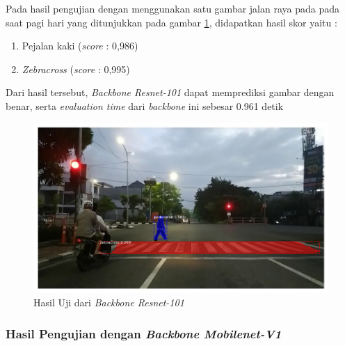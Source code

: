 Pada hasil pengujian dengan menggunakan satu gambar jalan raya pada pada saat pagi hari yang ditunjukkan pada gambar \ref{fig:hasil-resnet101}, didapatkan hasil skor yaitu :
\begin{enumerate}[nolistsep]
	\item Pejalan kaki (\textit{score} : 0,986)
	\item \textit{Zebracross} (\textit{score} : 0,995)
\end{enumerate}
Dari hasil tersebut, \textit{Backbone Resnet-101} dapat memprediksi gambar dengan benar, serta \textit{evaluation time} dari \textit{backbone} ini sebesar 0.961 detik
\begin{figure}[H] 
	\centering
	\includegraphics[scale=0.3]{gambar/hasil/resnet-101_fajar_800.png}
	\caption{Hasil Uji dari \textit{Backbone Resnet-101}}
	\label{fig:hasil-resnet101}
\end{figure}

\subsubsection{Hasil Pengujian dengan \textit{Backbone Mobilenet-V1}}

